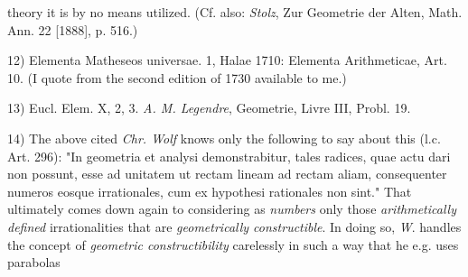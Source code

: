 \vfill
\leftline{\rule{2in}{0.4pt}}
\vspace{0.2cm}
{
\footnotesize
theory it is by no means utilized. (Cf. also: \textit{Stolz}, Zur Geometrie der Alten, Math. Ann. 22 [1888], p. 516.)

12) Elementa Matheseos universae. 1, Halae 1710: Elementa Arithmeticae, Art. 10. (I quote from the second edition of 1730 available to me.)

13) Eucl. Elem. X, 2, 3. \textit{A. M. Legendre}, Geometrie, Livre III, Probl. 19.

14) The above cited \textit{Chr. Wolf} knows only the following to say about this (l.c. Art. 296): "In geometria et analysi demonstrabitur, tales radices, quae actu dari non possunt, esse ad unitatem ut rectam lineam ad rectam aliam, consequenter numeros eosque irrationales, cum ex hypothesi rationales non sint." That ultimately comes down again to considering as \textit{numbers} only those \textit{arithmetically defined} irrationalities that are \textit{geometrically constructible}. In doing so, \textit{W}. handles the concept of \textit{geometric constructibility} carelessly in such a way that he e.g. uses parabolas

}
